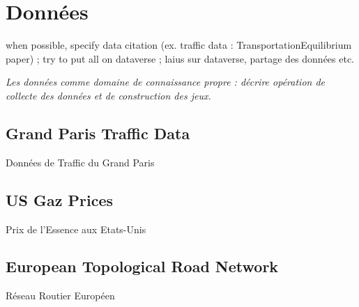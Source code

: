\chapter{Données}

\label{app:data} %



\headercit{}{}{}




when possible, specify data citation (ex. traffic data : TransportationEquilibrium paper) ; try to put all on dataverse ; laius sur dataverse, partage des données etc.

\textit{Les données comme domaine de connaissance propre : décrire opération de collecte des données et de construction des jeux.}

\section{Grand Paris Traffic Data}{Données de Traffic du Grand Paris}





\section{US Gaz Prices}{Prix de l'Essence aux Etats-Unis}




\section{European Topological Road Network}{Réseau Routier Européen}






